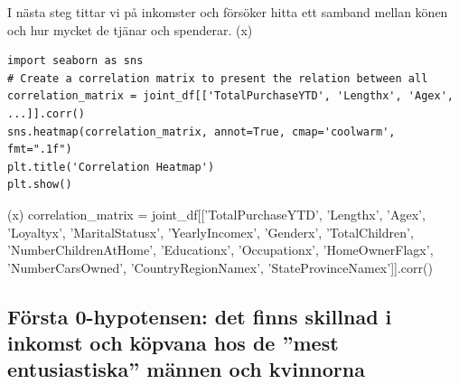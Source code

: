 \documentclass[]{article}
\begin{document}
I nästa steg tittar vi på inkomster och försöker hitta ett samband mellan könen och hur mycket de tjänar och spenderar.
\if(x)
\begin{lstlisting}
import seaborn as sns
# Create a correlation matrix to present the relation between all 
correlation_matrix = joint_df[['TotalPurchaseYTD', 'Lengthx', 'Agex', ...]].corr()
sns.heatmap(correlation_matrix, annot=True, cmap='coolwarm', fmt=".1f")
plt.title('Correlation Heatmap')
plt.show()
\end{lstlisting}
\fi
\if(x)
correlation_matrix = joint_df[['TotalPurchaseYTD', 'Lengthx', 'Agex', 'Loyaltyx', 
					'MaritalStatusx', 'YearlyIncomex', 'Genderx', 
					'TotalChildren', 'NumberChildrenAtHome', 
					'Educationx', 'Occupationx', 'HomeOwnerFlagx',
					'NumberCarsOwned', 'CountryRegionNamex', 
					'StateProvinceNamex']].corr()
\fi
{}


\subsection{Första 0-hypotensen: det finns skillnad i inkomst och köpvana hos de ''mest entusiastiska'' männen och kvinnorna}
\end{document}
